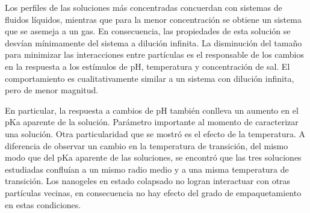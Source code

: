	Los perfiles de las soluciones m\'as concentradas concuerdan con sistemas de fluidos l\'iquidos, mientras que para la menor concentraci\'on se obtiene un sistema que se asemeja a un gas. En consecuencia, las propiedades de esta soluci\'on se desv\'ian m\'inimamente del sistema a diluci\'on infinita.
	La disminuci\'on del  tama\~no para minimizar las interacciones entre part\'iculas es el responsable de los cambios en la respuesta a los est\'imulos de pH, temperatura y concentraci\'on de sal. El comportamiento es cualitativamente similar a un sistema con diluci\'on infinita, pero de menor magnitud.
	
	En particular, la respuesta a cambios de pH tambi\'en conlleva un aumento en el pKa aparente de la soluci\'on. Par\'ametro importante al momento de caracterizar una soluci\'on.
	Otra particularidad que se mostr\'o es el efecto de la temperatura.
	A diferencia de observar un cambio en la temperatura de transici\'on, del mismo modo que del pKa aparente de las soluciones, se encontr\'o que las tres soluciones estudiadas conflu\'ian a un mismo radio medio y a una misma temperatura de transici\'on. Los nanogeles en estado colapsado no logran interactuar con otras part\'iculas vecinas, en consecuencia no hay efecto del grado de empaquetamiento en estas condiciones.
	
	